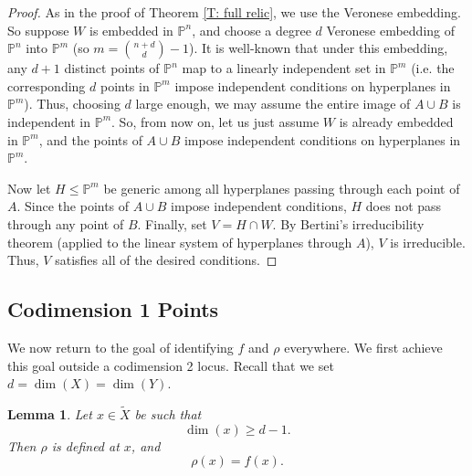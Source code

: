 \documentclass{amsart}
\newtheorem{lemma}[theorem]{Lemma}
\theoremstyle{definition}
\begin{document}
\begin{proof}
    As in the proof of Theorem \ref{T: full relic}, we use the Veronese embedding. So suppose $W$ is embedded in $\mathbb P^n$, and choose a degree $d$ Veronese embedding of $\mathbb P^n$ into $\mathbb P^m$ (so $m=\binom{n+d}{d}-1$). It is well-known that under this embedding, any $d+1$ distinct points of $\mathbb P^n$ map to a linearly independent set in $\mathbb P^m$ (i.e. the corresponding $d$ points in $\mathbb P^m$ impose independent conditions on hyperplanes in $\mathbb P^m$). Thus, choosing $d$ large enough, we may assume the entire image of $A\cup B$ is independent in $\mathbb P^m$. So, from now on, let us just assume $W$ is already embedded in $\mathbb P^m$, and the points of $A\cup B$ impose independent conditions on hyperplanes in $\mathbb P^m$.

    Now let $H\leq\mathbb P^m$ be generic among all hyperplanes passing through each point of $A$. Since the points of $A\cup B$ impose independent conditions, $H$ does not pass through any point of $B$. Finally, set $V=H\cap W$. By Bertini's irreducibility theorem (applied to the linear system of hyperplanes through $A$), $V$ is irreducible. Thus, $V$ satisfies all of the desired conditions.
\end{proof}

\subsection{Codimension 1 Points}

We now return to the goal of identifying $f$ and $\rho$ everywhere. We first achieve this goal outside a codimension 2 locus. Recall that we set $d=\dim(X)=\dim(Y)$.

\begin{lemma}\label{L: agreement in codim 1}
Let $x \in \widetilde{X}$ be such that
\[
\dim(x) \geq d - 1.
\]
Then $\rho$ is defined at $x$, and
\[
\rho(x) = f(x).
\]
\end{lemma}
\end{document}
